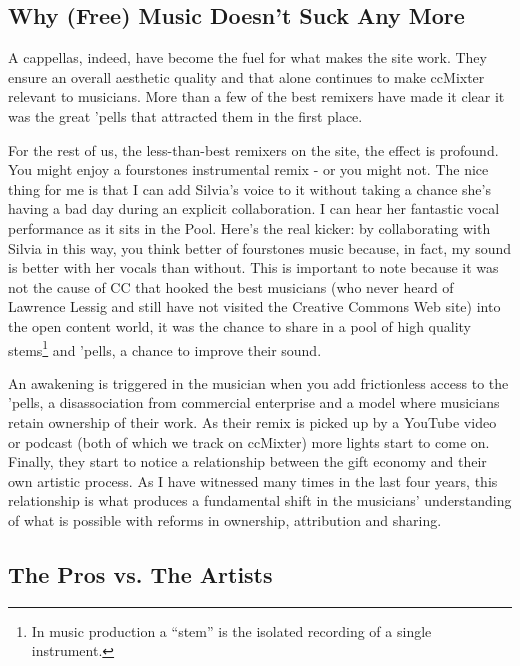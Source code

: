 \subsection{Why (Free) Music Doesn't Suck Any More}
\label{ss:unexpected_collaboration:a_capellas:why_free_music}

A cappellas, indeed, have become the fuel for what makes the site work. They
ensure an overall aesthetic quality and that alone continues to make ccMixter
relevant to musicians. More than a few of the best remixers have made it clear
it was the great 'pells that attracted them in the f\hbox{}irst place.

For the rest of us, the less-than-best remixers on the site, the ef\hbox{}fect is
profound. You might enjoy a fourstones instrumental remix - or you might not.
The nice thing for me is that I can add Silvia's voice to it without taking a
chance she's having a bad day during an explicit collaboration. I can hear her
fantastic vocal performance as it sits in the Pool. Here's the real kicker: by
collaborating with Silvia in this way, you think better of fourstones music
because, in fact, my sound is better with her vocals than without. This is
important to note because it was not the cause of CC that hooked the best
musicians (who never heard of Lawrence Lessig and still have not visited the
Creative Commons Web site) into the open content world, it was the chance to
share in a pool of high quality stems\footnote{In music production a ``stem'' is
the isolated recording of a single instrument.} and 'pells, a chance to improve
their sound.

An awakening is triggered in the musician when you add frictionless access to
the 'pells, a disassociation from commercial enterprise and a model where
musicians retain ownership of their work. As their remix is picked up by a
YouTube video or podcast (both of which we track on ccMixter) more lights start
to come on. F\hbox{}inally, they start to notice a relationship between the gift
economy and their own artistic process. As I have witnessed many times in the
last four years, this relationship is what produces a fundamental shift in the
musicians' understanding of what is possible with reforms in ownership,
attribution and sharing.


\subsection{The Pros vs. The Artists}
\label{ss:unexpected_collaboration:a_capellas:pros_vs_artists}

